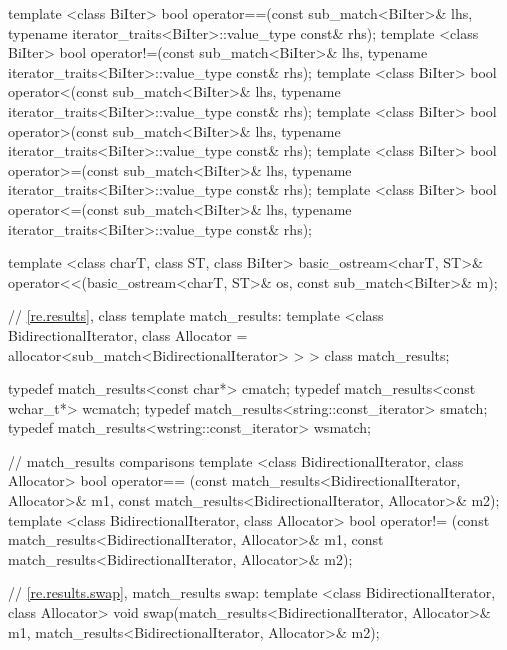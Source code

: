 \begin{codeblock}
{  template <class BiIter> 
    bool operator==(const sub_match<BiIter>& lhs, 
                    typename iterator_traits<BiIter>::value_type const& rhs); 
  template <class BiIter> 
    bool operator!=(const sub_match<BiIter>& lhs, 
                    typename iterator_traits<BiIter>::value_type const& rhs); 
  template <class BiIter> 
    bool operator<(const sub_match<BiIter>& lhs, 
                   typename iterator_traits<BiIter>::value_type const& rhs); 
  template <class BiIter> 
    bool operator>(const sub_match<BiIter>& lhs, 
                   typename iterator_traits<BiIter>::value_type const& rhs); 
  template <class BiIter> 
    bool operator>=(const sub_match<BiIter>& lhs, 
                    typename iterator_traits<BiIter>::value_type const& rhs); 
  template <class BiIter> 
    bool operator<=(const sub_match<BiIter>& lhs, 
                    typename iterator_traits<BiIter>::value_type const& rhs); 

  template <class charT, class ST, class BiIter>
    basic_ostream<charT, ST>&
    operator<<(basic_ostream<charT, ST>& os, const sub_match<BiIter>& m);

  // \ref{re.results}, class template match_results:
  template <class BidirectionalIterator,
            class Allocator = allocator<sub_match<BidirectionalIterator> > >
    class match_results;

  typedef match_results<const char*>             cmatch;
  typedef match_results<const wchar_t*>          wcmatch;
  typedef match_results<string::const_iterator>  smatch;
  typedef match_results<wstring::const_iterator> wsmatch;

  // match_results comparisons
  template <class BidirectionalIterator, class Allocator>
    bool operator== (const match_results<BidirectionalIterator, Allocator>& m1,
                     const match_results<BidirectionalIterator, Allocator>& m2);
  template <class BidirectionalIterator, class Allocator>
    bool operator!= (const match_results<BidirectionalIterator, Allocator>& m1,
                     const match_results<BidirectionalIterator, Allocator>& m2);

  // \ref{re.results.swap}, match_results swap:
  template <class BidirectionalIterator, class Allocator>
    void swap(match_results<BidirectionalIterator, Allocator>& m1,
              match_results<BidirectionalIterator, Allocator>& m2);

}
\end{codeblock}
